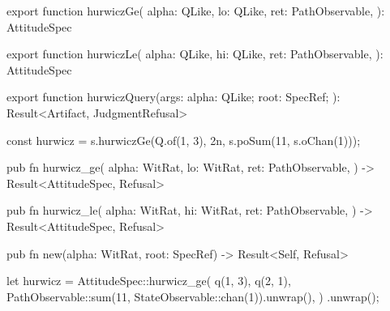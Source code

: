 \begin{tssrc}
export function hurwiczGe(
  alpha: QLike,
  lo: QLike,
  ret: PathObservable,
): AttitudeSpec

export function hurwiczLe(
  alpha: QLike,
  hi: QLike,
  ret: PathObservable,
): AttitudeSpec

export function hurwiczQuery(args: {
  alpha: QLike;
  root: SpecRef;
}): Result<Artifact, JudgmentRefusal>
\end{tssrc}
\begin{tssrc}
const hurwicz = s.hurwiczGe(Q.of(1, 3), 2n, s.poSum(11, s.oChan(1)));
\end{tssrc}
\begin{rustsrc}
pub fn hurwicz_ge(
    alpha: WitRat,
    lo: WitRat,
    ret: PathObservable,
) -> Result<AttitudeSpec, Refusal>

pub fn hurwicz_le(
    alpha: WitRat,
    hi: WitRat,
    ret: PathObservable,
) -> Result<AttitudeSpec, Refusal>

pub fn new(alpha: WitRat, root: SpecRef) -> Result<Self, Refusal>
\end{rustsrc}
\begin{rustsrc}
let hurwicz = AttitudeSpec::hurwicz_ge(
    q(1, 3),
    q(2, 1),
    PathObservable::sum(11, StateObservable::chan(1)).unwrap(),
)
.unwrap();
\end{rustsrc}
